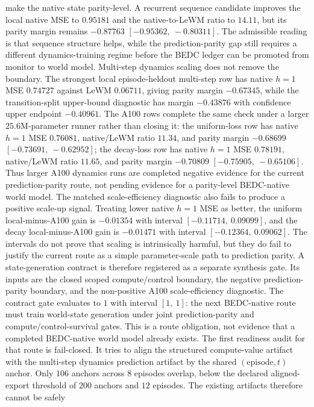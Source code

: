 make the native state parity-level.  A recurrent sequence candidate improves
the local native MSE to $0.95181$ and the native-to-LeWM ratio to $14.11$, but
its parity margin remains $-0.87763$ $[-0.95362,\ -0.80311]$.  The admissible
reading is that sequence structure helps, while the prediction-parity gap
still requires a different dynamics-training regime before the BEDC ledger can
be promoted from monitor to world model.
Multi-step dynamics scaling does not remove the boundary.  The strongest local
episode-heldout multi-step row has native $h=1$ MSE $0.74727$ against LeWM
$0.06711$, giving parity margin $-0.67345$, while the transition-split
upper-bound diagnostic has margin $-0.43876$ with confidence upper endpoint
$-0.40961$.  The A100 rows complete the same check under a larger
$25.6$M-parameter runner rather than closing it: the uniform-loss row has native
$h=1$ MSE $0.76081$, native/LeWM ratio $11.34$, and parity margin $-0.68699$
$[-0.73691,\ -0.62952]$; the decay-loss row has native $h=1$ MSE $0.78191$,
native/LeWM ratio $11.65$, and parity margin $-0.70809$
$[-0.75905,\ -0.65106]$.  Thus larger A100 dynamics runs are completed negative
evidence for the current prediction-parity route, not pending evidence for a
parity-level BEDC-native world model.
The matched scale-efficiency diagnostic also fails to produce a positive
scale-up signal.  Treating lower native $h=1$ MSE as better, the uniform
local-minus-A100 gain is $-0.01354$ with interval
$[-0.11714,\ 0.09099]$, and the decay local-minus-A100 gain is $-0.01471$ with
interval $[-0.12364,\ 0.09062]$.  The intervals do not prove that scaling is
intrinsically harmful, but they do fail to justify the current route as a
simple parameter-scale path to prediction parity.
A state-generation contract is therefore registered as a separate synthesis
gate.  Its inputs are the closed scoped compute/control boundary, the negative
prediction-parity boundary, and the non-positive A100 scale-efficiency
diagnostic.  The contract gate evaluates to $1$ with interval $[1,\ 1]$: the
next BEDC-native route must train world-state generation under joint
prediction-parity and compute/control-survival gates.  This is a route
obligation, not evidence that a completed BEDC-native world model already
exists.
The first readiness audit for that route is fail-closed.  It tries to align the
structured compute-value artifact with the multi-step dynamics prediction
artifact by the shared $(\mathrm{episode},t)$ anchor.  Only $106$ anchors across
$8$ episodes overlap, below the declared aligned-export threshold of $200$
anchors and $12$ episodes.  The existing artifacts therefore cannot be safely
